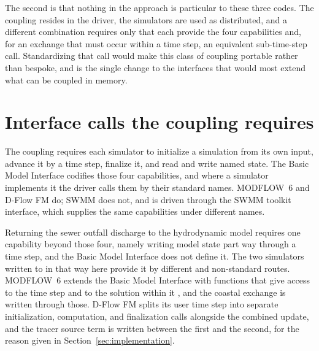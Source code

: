 \documentclass[preprint,authoryear,11pt]{elsarticle}
\begin{document}
The second is that nothing in the approach is particular to these three codes. The coupling resides in the driver, the simulators are used as distributed, and a different combination requires only that each provide the four capabilities and, for an exchange that must occur within a time step, an equivalent sub-time-step call. Standardizing that call would make this class of coupling portable rather than bespoke, and is the single change to the interfaces that would most extend what can be coupled in memory.

\appendix

\section{Interface calls the coupling requires}
\label{app:interface}

The coupling requires each simulator to initialize a simulation from its own input, advance it by a time step, finalize it, and read and write named state. The Basic Model Interface \citep{hutton2020bmi} codifies those four capabilities, and where a simulator implements it the driver calls them by their standard names. MODFLOW~6 and D-Flow FM do; SWMM does not, and is driven through the SWMM toolkit interface, which supplies the same capabilities under different names.

Returning the sewer outfall discharge to the hydrodynamic model requires one capability beyond those four, namely writing model state part way through a time step, and the Basic Model Interface does not define it. The two simulators written to in that way here provide it by different and non-standard routes. MODFLOW~6 extends the Basic Model Interface with functions that give access to the time step and to the solution within it \citep{hughes2022modflowapi}, and the coastal exchange is written through those. D-Flow FM splits its user time step into separate initialization, computation, and finalization calls alongside the combined update, and the tracer source term is written between the first and the second, for the reason given in Section~\ref{sec:implementation}.
\end{document}
